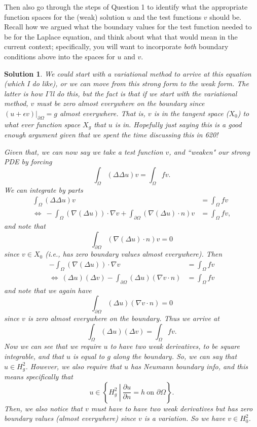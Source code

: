 \documentclass[leqno]{article}
\theoremstyle{nonumberplain}
\newtheorem{solution}{Solution}
\begin{document}
Then also go through the steps of Question 1 to identify what the
appropriate function spaces for the (weak) solution $u$ and the test
functions $v$ should be. Recall how we argued what the boundary values
for the test function needed to be for the Laplace equation, and think
about what that would mean in the current context; specifically, you
will want to incorporate \textit{both} boundary conditions above into
the spaces for $u$ and $v$.

\begin{solution}
We could start with a variational method to arrive at this equation (which I do like), or we can move from this strong form to the weak form.  The latter is how I'll do this, but the fact is that if we start with the variational method, $v$ must be zero almost everywhere on the boundary since $(u+\epsilon v)\vert_{\partial \Omega}=g$ almost everywhere. That is, $v$ is in the tangent space ($X_0$) to what ever function space $X_g$ that $u$ is in. Hopefully just saying this is a good enough argument given that we spent the time discussing this in 620!

Given that, we can now say we take a test function $v$, and ``weaken" our strong PDE by forcing
\[
\int_\Omega (\Delta \Delta u)v = \int_\Omega fv.
\]
We can integrate by parts
\begin{align*}
    \int_\Omega (\Delta \Delta u)v &= \int_\Omega fv\\
    \iff~ - \int_\Omega (\nabla (\Delta u))\cdot \nabla v + \int_{\partial \Omega} (\nabla (\Delta u)\cdot n) v &= \int_\Omega fv,
\end{align*}
and note that
\[
\int_{\partial \Omega} (\nabla (\Delta u)\cdot n) v =0
\]
since $v\in X_0$ (i.e., has zero boundary values almost everywhere). Then
\begin{align*}
    -\int_\Omega (\nabla (\Delta u))\cdot \nabla v &= \int_\Omega fv\\
    \iff ~ (\Delta u) (\Delta v) - \int_{\partial \Omega} (\Delta u)(\nabla v \cdot n) &= \int_\Omega fv
\end{align*}
and note that we again have
\[
\int_{\partial \Omega} (\Delta u)(\nabla v \cdot n) = 0
\]
since $v$ is zero almost everywhere on the boundary.  Thus we arrive at
\[
\int_\Omega (\Delta u)(\Delta v) = \int_\Omega fv.
\]
Now we can see that we require $u$ to have two weak derivatives, to be square integrable, and that $u$ is equal to $g$ along the boundary.  So, we can say that $u\in H^2_g$.  However, we also require that $u$ has Neumann boundary info, and this means specifically that
\[
u \in \left\{ H^2_g ~\left\vert~ \frac{\partial u}{\partial n}\right. = h ~ \textrm{on $\partial \Omega$}\right\}.
\]
Then, we also notice that $v$ must have to have two weak derivatives but has zero boundary values (almost everywhere) since $v$ is a variation.  So we have $v\in H^2_0$. 


\end{solution}
\end{document}
